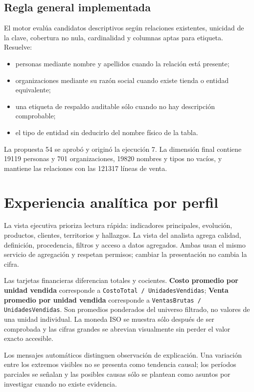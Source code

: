 \documentclass[11pt,letterpaper]{article}
\newcommand{\file}[1]{\texttt{#1}}
\begin{document}
\subsection{Regla general implementada}

El motor evalúa candidatos descriptivos según relaciones existentes, unicidad de la clave, cobertura no nula, cardinalidad y columnas aptas para etiqueta. Resuelve:

\begin{itemize}
  \item personas mediante nombre y apellidos cuando la relación está presente;
  \item organizaciones mediante su razón social cuando existe tienda o entidad equivalente;
  \item una etiqueta de respaldo auditable sólo cuando no hay descripción comprobable;
  \item el tipo de entidad sin deducirlo del nombre físico de la tabla.
\end{itemize}

La propuesta 54 se aprobó y originó la ejecución 7. La dimensión final contiene 19119 personas y 701 organizaciones, 19820 nombres y tipos no vacíos, y mantiene las relaciones con las 121317 líneas de venta.

\section{Experiencia analítica por perfil}

La vista ejecutiva prioriza lectura rápida: indicadores principales, evolución, productos, clientes, territorios y hallazgos. La vista del analista agrega calidad, definición, procedencia, filtros y acceso a datos agregados. Ambas usan el mismo servicio de agregación y respetan permisos; cambiar la presentación no cambia la cifra.

Las tarjetas financieras diferencian totales y cocientes. \textbf{Costo promedio por unidad vendida} corresponde a \file{CostoTotal / UnidadesVendidas}; \textbf{Venta promedio por unidad vendida} corresponde a \file{VentasBrutas / UnidadesVendidas}. Son promedios ponderados del universo filtrado, no valores de una unidad individual. La moneda ISO se muestra sólo después de ser comprobada y las cifras grandes se abrevian visualmente sin perder el valor exacto accesible.

Los mensajes automáticos distinguen observación de explicación. Una variación entre los extremos visibles no se presenta como tendencia causal; los períodos parciales se señalan y las posibles causas sólo se plantean como asuntos por investigar cuando no existe evidencia.
\end{document}
